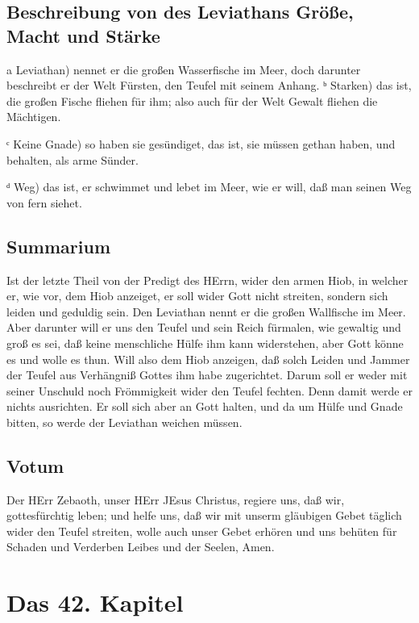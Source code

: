 \section{Beschreibung von des Leviathans Größe, Macht und Stärke}

a Leviathan) nennet er die großen Wasserfische im Meer, doch darunter beschreibt er der Welt Fürsten, den Teufel mit seinem Anhang.
ᵇ Starken) das ist, die großen Fische fliehen für ihm; also auch für der Welt Gewalt fliehen die Mächtigen.

ᶜ Keine Gnade) so haben sie gesündiget, das ist, sie müssen gethan haben, und behalten, als arme Sünder.

ᵈ Weg) das ist, er schwimmet und lebet im Meer, wie er will, daß man seinen Weg von fern siehet.

\section{Summarium}

Ist der letzte Theil von der Predigt des HErrn, wider den armen Hiob, in welcher er, wie vor, dem Hiob anzeiget, er soll wider Gott nicht streiten, sondern sich leiden und geduldig sein. Den Leviathan nennt er die großen Wallfische im Meer. Aber darunter will er uns den Teufel und sein Reich fürmalen, wie gewaltig und groß es sei, daß keine menschliche Hülfe ihm kann widerstehen, aber Gott könne es und wolle es thun. Will also dem Hiob anzeigen, daß solch Leiden und Jammer der Teufel aus Verhängniß Gottes ihm habe zugerichtet. Darum soll er weder mit seiner Unschuld noch Frömmigkeit wider den Teufel fechten. Denn damit werde er nichts ausrichten. Er soll sich aber an Gott halten, und da um Hülfe und Gnade bitten, so werde der Leviathan weichen müssen.

\section{Votum}

Der HErr Zebaoth, unser HErr JEsus Christus, regiere uns, daß wir, gottesfürchtig leben; und helfe uns, daß wir mit unserm gläubigen Gebet täglich wider den Teufel streiten, wolle auch unser Gebet erhören und uns behüten für Schaden und Verderben Leibes und der Seelen, Amen.

\chapter{Das 42. Kapitel}

